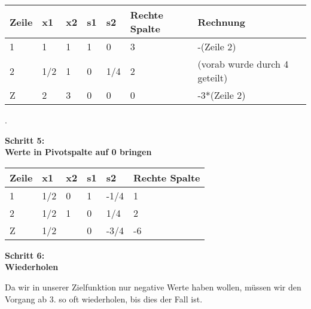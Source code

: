 \begin{table}[h]
\begin{tabular}{|l|l|l|l|l|l|l|}
\hline
\rowcolor[HTML]{C0C0C0} 
Zeile                     & x1  & x2                        & s1 & s2  & Rechte Spalte & Rechnung                      \\ \hline
\cellcolor[HTML]{C0C0C0}1 & 1   & \cellcolor[HTML]{FFFFFF}1 & 1  & 0   & 3             & -(Zeile 2)                    \\ \hline
\rowcolor[HTML]{FFFFFF} 
\cellcolor[HTML]{C0C0C0}2 & 1/2 & \cellcolor[HTML]{68CBD0}1 & 0  & 1/4 & 2             & (vorab wurde durch 4 geteilt) \\ \hline
\cellcolor[HTML]{C0C0C0}Z & 2   & \cellcolor[HTML]{FFFFFF}3 & 0  & 0   & 0             & -3*(Zeile 2)                  \\ \hline
\end{tabular}
\end{table}
.\\
\begin{center}
\textbf{Schritt 5:\\Werte in Pivotspalte auf 0 bringen }\end{center}
\begin{table}[!ht]
\begin{tabular}{|l|l|l|l|l|l|}
\hline
\rowcolor[HTML]{C0C0C0} 
Zeile                     & x1  & x2 & s1 & s2   & Rechte Spalte \\ \hline
\rowcolor[HTML]{FFFFFF} 
\cellcolor[HTML]{C0C0C0}1 & 1/2 & 0  & 1  & -1/4 & 1             \\ \hline
\rowcolor[HTML]{FFFFFF} 
\cellcolor[HTML]{C0C0C0}2 & 1/2 & 1  & 0  & 1/4  & 2             \\ \hline
\rowcolor[HTML]{FFFFFF} 
\cellcolor[HTML]{C0C0C0}Z & 1/2 &    & 0  & -3/4 & -6            \\ \hline
\end{tabular}
\end{table}
\begin{center}\textbf{Schritt 6:\\ Wiederholen}\end{center}
Da wir in unserer Zielfunktion nur negative Werte haben wollen, müssen wir den Vorgang ab 3. so oft wiederholen, bis dies der Fall ist.\\

